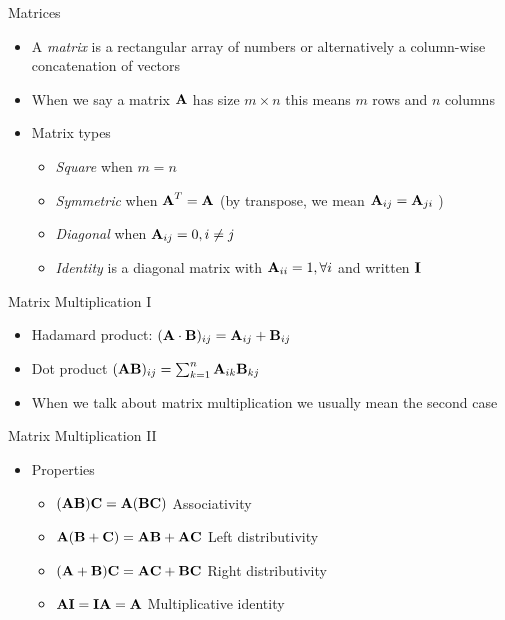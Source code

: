 \documentclass{beamer}
\begin{document}
\begin{frame}{Matrices} 
\begin{itemize}
 \item A \emph{matrix} is a rectangular array of numbers or alternatively a column-wise concatenation of vectors 
 \item When we say a matrix $\textbf{A}$ has size $m \times n$ this means $m$ rows and $n$ columns 
 \item Matrix types 
 \begin{itemize}
 \item \emph{Square} when $m = n$ 
 \item \emph{Symmetric} when $\textbf{A}^T = \textbf{A}$ (by transpose, we mean $\textbf{A}_{ij} = \textbf{A}_{ji}$ )
 \item \emph{Diagonal} when $\textbf{A}_{ij} = 0, i \neq j$ 
 \item \emph{Identity} is a diagonal matrix with $\textbf{A}_{ii} = 1, \forall i$ and written $\textbf{I}$ 
 \end{itemize}
\end{itemize}
\end{frame}

\begin{frame}{Matrix Multiplication I} 
\begin{itemize} 
 \item Hadamard product: $(\textbf{A} \cdot \textbf{B})_{ij} = \textbf{A}_{ij} + \textbf{B}_{ij}$ 
 \item Dot product $(\textbf{A}\textbf{B})_{ij} = \sum_{k=1}^n \textbf{A}_{ik}\textbf{B}_{kj}$
 \item When we talk about matrix multiplication we usually mean the second case 
\end{itemize}
\end{frame}

\begin{frame}{Matrix Multiplication II}
\begin{itemize} 
  \item Properties 
 \begin{itemize}
 \item $(\textbf{A}\textbf{B})\textbf{C} = \textbf{A}(\textbf{B}\textbf{C})$ Associativity 
 \item $\textbf{A}(\textbf{B} + \textbf{C}) = \textbf{A}\textbf{B} + \textbf{A}\textbf{C}$ Left distributivity 
 \item $(\textbf{A} +\textbf{B}) \textbf{C} = \textbf{A}\textbf{C} +\textbf{B}\textbf{C}$ Right distributivity 
 \item $\textbf{A}\textbf{I} = \textbf{I}\textbf{A} = \textbf{A}$ Multiplicative identity 
 \end{itemize} 
 \end{itemize}
\end{frame}
\end{document}
